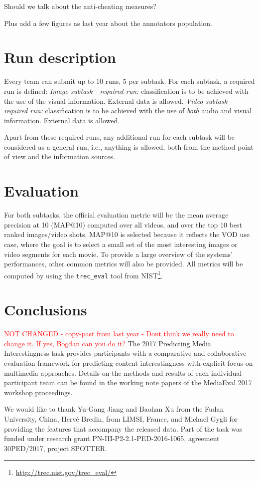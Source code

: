 \documentclass[sigconf]{acmart-me}
\begin{document}
Should we talk about the anti-cheating measures?

Plus add a few figures as last year about the annotators population.


\section{Run description}

Every team can submit up to 10 runs, 5 per subtask. For each subtask, a required run is defined: \emph{Image subtask - required run:} classification is to be achieved with the use of the visual information. External data is allowed. \emph{Video subtask - required run:} classification is to be achieved with the use of \emph{both} audio and visual information. External data is allowed.

Apart from these required runs, any additional run for each subtask will be considered as a general run, i.e., anything is allowed, both from the method point of view and the information sources. 

\section{Evaluation}

For both subtasks, the official evaluation metric will be the mean average precision at 10 (MAP@10) computed over all videos, and over the top 10 best ranked images/video shots. MAP@10 is selected because it reflects the VOD use case, where the goal is to select a small set of the most interesting images or video segments for each movie. To provide a large overview of the systems' performances, other common metrics will also be provided. All metrics will be computed by using the \texttt{trec\_eval} tool from
NIST\footnote{\url{http://trec.nist.gov/trec\_eval/}}.

\section{Conclusions}
\textcolor{red}{NOT CHANGED - copy-past from last year - Dont think we really need to change it. If yes, Bogdan can you do it?}
The 2017 Predicting Media Interestingness task provides participants
with a comparative and collaborative evaluation framework for
predicting content interestingness with explicit focus on
multimedia approaches. Details on the methods and results of each individual
participant team can be found in the working note papers of the
MediaEval 2017 workshop proceedings.

\begin{acks}
We would like to thank Yu-Gang Jiang and Baohan Xu
from the Fudan University, China, Herv\'{e} Bredin, from LIMSI,
France, and Michael Gygli for providing the features that accompany the
released data. Part of the task was funded under research grant PN-III-P2-2.1-PED-2016-1065, agreement 30PED/2017, project SPOTTER.
\end{acks}



\def\bibfont{\small} %

\end{document}
